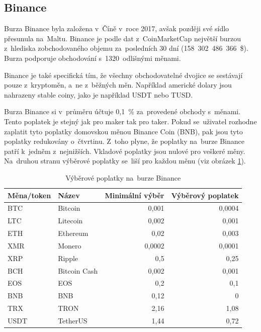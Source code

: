 \documentclass[thesis=B,czech]{FITthesis}[2019/03/21]
\begin{document}
\subsection{Binance}
Burza Binance byla založena v~Číně v~roce 2017, avšak později své sídlo přesunula na~Maltu. Binance je podle dat z~CoinMarketCap největší burzou z~hlediska zobchodovaného objemu za~posledních 30 dní (158~302~486~366~\$). \cite{coinmarketcap} Burza podporuje obchodování s~1320~odlišnými měnami.

Binance je také specifická tím, že všechny obchodovatelné dvojice se  \linebreak sestávají pouze z~kryptoměn, a~ne z~běžných měn. Například americké dolary jsou nahrazeny stable coiny, jako je například USDT nebo TUSD. 

Burza Binance si v~průměru účtuje 0,1~\% za~provedené obchody s~měnami. Tento poplatek je stejný jak pro maker tak pro taker. Pokud se~uživatel rozhodne zaplatit tyto poplatky domovskou měnou Binance Coin (BNB), pak jsou tyto poplatky redukovány o~čtvrtinu. Z~toho plyne, že poplatky na~burze Binance patří k~jedněm z~nejnižších. Vkladové poplatky jsou nulové pro veškeré měny. Na~druhou stranu výběrové poplatky se~liší pro každou měnu (viz obrázek \ref{binance_fees}). \cite{blockonomi_binance}

\begin{table}\centering
    \caption{Výběrové poplatky na~burze Binance \cite{binance_fees}}
    \label{binance_fees}
     \begin{tabular}{||l | l | r | r||} 
     \hline
     Měna/token & Název & Minimální výběr & Výběrový poplatek \\ [0.5ex] 
     \hline\hline
     BTC & Bitcoin & 0,001 & 0,0004 \\ 
     \hline
     LTC & Litecoin & 0,002 & 0,001 \\
     \hline
     ETH & Ethereum & 0,02 & 0,003 \\
     \hline
     XMR & Monero & 0,0002 & 0,0001 \\
     \hline
     XRP & Ripple & 0,5 & 0,25 \\
     \hline
     BCH & Bitcoin Cash & 0,002 & 0,001 \\
     \hline
     EOS & EOS & 0,2 & 0,1 \\
     \hline
     BNB & BNB & 0,12 & 0 \\
     \hline
     TRX & TRON & 2,16 & 1,08 \\
     \hline
     USDT & TetherUS & 1,44 & 0,72 \\
     \hline
    \end{tabular}
\end{table}
\end{document}
